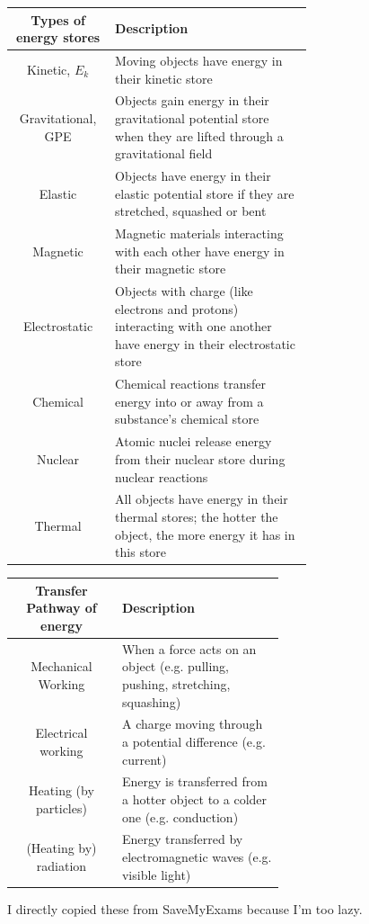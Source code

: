 \documentclass[a4paper,12pt]{article}
\begin{document}
\begin{center}
    \begin{tabular}{|c|>{\centering\arraybackslash}p{0.66\linewidth}|}\hline
         \textbf{Types of energy stores} & \textbf{Description}\\\hline
         Kinetic, \(E_k\)& Moving objects have energy in their kinetic store\\\hline
         Gravitational, GPE& Objects gain energy in their gravitational potential store when they are lifted through a gravitational field\\\hline
         Elastic& Objects have energy in their elastic potential store if they are stretched, squashed or bent\\\hline
         Magnetic& Magnetic materials interacting with each other have energy in their magnetic store\\\hline
         Electrostatic& Objects with charge (like electrons and protons) interacting with one another have energy in their electrostatic store\\\hline
         Chemical& Chemical reactions transfer energy into or away from a substance's chemical store\\\hline
         Nuclear& Atomic nuclei release energy from their nuclear store during nuclear reactions\\\hline
         Thermal& All objects have energy in their thermal stores; the hotter the object, the more energy it has in this store\\\hline
    \end{tabular}
    \begin{tabular}{|c|>{\centering\arraybackslash}p{0.6\linewidth}|}\hline
        \textbf{Transfer Pathway of energy} & \textbf{Description}\\\hline
        Mechanical Working & When a force acts on an object (e.g. pulling, pushing, stretching, squashing)\\\hline
        Electrical working & A charge moving through a potential difference (e.g. current) \\\hline
        Heating (by particles) & Energy is transferred from a hotter object to a colder one (e.g. conduction) \\\hline
        (Heating by) radiation & Energy transferred by electromagnetic waves (e.g. visible light)\\\hline
    \end{tabular}
\end{center}
I directly copied these from SaveMyExams because I'm too lazy.\\\\
\end{document}
